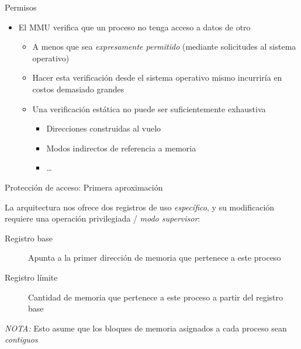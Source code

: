 \documentclass[presentation]{beamer}
\begin{document}
\begin{frame}[label={sec:orgc78ee42}]{Permisos}
\begin{itemize}
\item El MMU verifica que un proceso no tenga acceso a datos de otro
\begin{itemize}
\item A menos que sea \emph{expresamente permitido} (mediante solicitudes al
sistema operativo)
\item Hacer esta verificación desde el sistema operativo mismo
incurriría en costos demasiado grandes
\item Una verificación estática no puede ser suficientemente exhaustiva
\begin{itemize}
\item Direcciones construidas al vuelo
\item Modos indirectos de referencia a memoria
\item \ldots{}
\end{itemize}
\end{itemize}
\end{itemize}
\end{frame}

\begin{frame}[label={sec:orgb94ea82}]{Protección de acceso: Primera aproximación}
\begin{center}
La arquitectura nos ofrece dos registros de uso \emph{específico}, y su
modificación requiere una operación privilegiada / \emph{modo supervisor}:
\end{center}
\begin{description}
\item[{Registro base}] Apunta a la primer dirección de memoria que
pertenece a este proceso
\item[{Registro límite}] Cantidad de memoria que pertenece a este proceso
a partir del registro base
\end{description}
\begin{center}
\emph{NOTA:} Esto asume que los bloques de memoria asignados a cada proceso
sean \emph{contiguos}
\end{center}
\end{frame}
\end{document}
